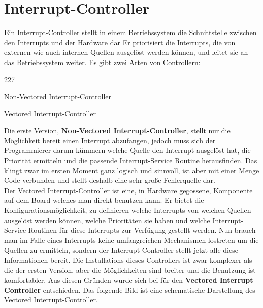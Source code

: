\section{Interrupt-Controller}
Ein Interrupt-Controller stellt in einem Betriebssystem die Schnittstelle zwischen den Interrupts und der Hardware dar Er priorisiert die Interrupts, die von externen wie auch internen Quellen ausgel\"ost werden k\"onnen, und leitet sie an das Betriebssystem weiter. Es gibt zwei Arten von Controllern:
\begin{dinglist}{227}
	\item{Non-Vectored Interrupt-Controller}
	\item{Vectored Interrupt-Controller}
\end{dinglist}
Die erste Version, \textbf{Non-Vectored Interrupt-Controller}, stellt nur die M\"oglichkeit bereit einen Interrupt abzufangen, jedoch muss sich der Programmierer darum k\"ummern welche Quelle den Interrupt ausgel\"ost hat, die Priorit\"at ermitteln und die passende Interrupt-Service Routine herausfinden. Das klingt zwar im ersten Moment ganz logisch und sinnvoll, ist aber mit einer Menge Code verbunden und stellt deshalb eine sehr gro\ss e Fehlerquelle dar.\\
Der Vectored Interrupt-Controller ist eine, in Hardware gegossene, Komponente auf dem Board welches man direkt benutzen kann. Er bietet die Konfigurationsm\"oglichkeit, zu definieren welche Interrupts von welchen Quellen ausgel\"ost werden k\"onnen, welche Priorit\"aten sie haben und welche Interrupt-Service Routinen f\"ur diese Interrupts zur Verf\"ugung gestellt werden. Nun brauch man im Falle eines Interrupts keine umfangreichen Mechanismen lostreten um die Quellen zu ermitteln, sondern der Interrupt-Controller stellt jetzt alle diese Informationen bereit. Die Installations dieses Controllers ist zwar komplexer als die der ersten Version, aber die M\"oglichkeiten sind breiter und die Benutzung ist komfortabler. Aus diesen Gr\"unden wurde sich bei \mops f\"ur den \textbf{Vectored Interrupt Controller} entschieden.
Das folgende Bild ist eine schematische Darstellung des Vectored Interrupt-Controller.

